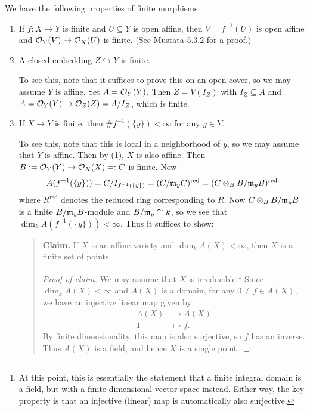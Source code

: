 \begin{remark}
  We have the following properties of
  finite morphisms:
  \begin{enumerate}
    \item If $f : X \to Y$ is finite and
      $U \subseteq Y$ is open affine, then
      $V = f^{-1}(U)$ is open affine and
      $\mathcal{O}_Y(V) \to \mathcal{O}_X(U)$ is finite.
      (See Mustata 5.3.2 for a proof.)
    \item A closed embedding
      $Z \hookrightarrow Y$ is finite.

      To see this, note that
      it suffices to prove this on an
      open cover, so we may assume
      $Y$ is affine. Set $A = \mathcal{O}_Y(Y)$.
      Then $Z = V(I_Z)$ with $I_Z \subseteq A$
      and $A = \mathcal{O}_Y(Y) \to \mathcal{O}_Z(Z) = A / I_Z$,
      which is finite.
    \item If $X \to Y$ is finite, then
      $\# f^{-1}(\{y\}) < \infty$ for any
      $y \in Y$.

      To see this, note that this is local in
      a neighborhood of $y$, so we may assume
      that $Y$ is affine. Then by (1),
      $X$ is also affine. Then
      $B := \mathcal{O}_Y(Y) \to \mathcal{O}_X(X) =: C$
      is finite. Now
      \[
        A(f^{-1}(\{y\}))
        = C / I_{f^{-1}(\{y\})}
        = (C / \mathfrak{m}_y C)^{\mathrm{red}}
        = (C \otimes_B B / \mathfrak{m}_y B)^{\mathrm{red}}
      \]
      where $R^{\mathrm{red}}$ denotes
      the reduced ring corresponding to $R$.
      Now $C \otimes_B B / \mathfrak{m}_y B$ is a
      finite $B / \mathfrak{m}_y B$-module and
      $B / \mathfrak{m}_y \cong k$, so we see that
      $\dim_k A(f^{-1}(\{y\})) < \infty$.
      Thus it suffices to show:
      \begin{quote}
        \textbf{Claim.} If $X$ is an affine
        variety and $\dim_k A(X) < \infty$,
        then $X$ is a finite set of points.

        \begin{proof}[Proof of claim]
          We may assume that $X$ is
          irreducible.\footnote{At this point, this is essentially the statement that a finite integral domain is a field, but with a finite-dimensional vector space instead. Either way, the key property is that an injective (linear) map is automatically also surjective.} Since $\dim_k A(X) < \infty$
          and $A(X)$ is a domain, for any
          $0 \ne f \in A(X)$, we have an
          injective linear map given by
          \begin{align*}
            A(X) &\longrightarrow A(X) \\
            1 &\longmapsto f.
          \end{align*}
          By finite dimensionality, this map
          is also surjective, so $f$ has an inverse.
          Thus $A(X)$ is a field, and hence
          $X$ is a single point.
        \end{proof}
      \end{quote}
  \end{enumerate}
\end{remark}

